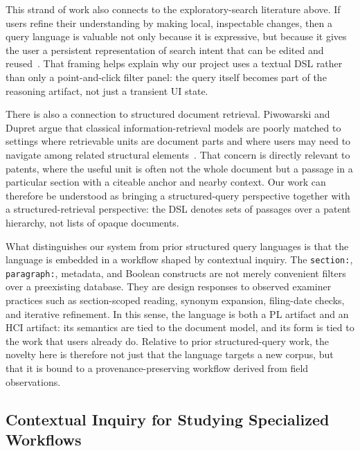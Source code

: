 \documentclass[sigconf]{acmart}
\begin{document}
This strand of work also connects to the exploratory-search literature above.
If users refine their understanding by making local, inspectable changes, then
a query language is valuable not only because it is expressive, but because it
gives the user a persistent representation of search intent that can be edited
and reused~\cite{Marchionini2006,White2009}. That framing helps explain why
our project uses a textual DSL rather than only a point-and-click filter panel:
the query itself becomes part of the reasoning artifact, not just a transient
UI state.

There is also a connection to structured document retrieval. Piwowarski and
Dupret argue that classical information-retrieval models are poorly matched to
settings where retrievable units are document parts and where users may need to
navigate among related structural elements~\cite{Piwowarski2006}. That concern
is directly relevant to patents, where the useful unit is often not the whole
document but a passage in a particular section with a citeable anchor and nearby
context. Our work can therefore be understood as bringing a structured-query
perspective together with a structured-retrieval perspective: the DSL denotes
sets of passages over a patent hierarchy, not lists of opaque documents.

What distinguishes our system from prior structured query languages is that the
language is embedded in a workflow shaped by contextual inquiry. The
\texttt{section:}, \texttt{paragraph:}, metadata, and Boolean constructs are
not merely convenient filters over a preexisting database. They are design
responses to observed examiner practices such as section-scoped reading,
synonym expansion, filing-date checks, and iterative refinement. In this sense,
the language is both a PL artifact and an HCI artifact: its semantics are tied
to the document model, and its form is tied to the work that users already do.
Relative to prior structured-query work, the novelty here is therefore not just
that the language targets a new corpus, but that it is bound to a
provenance-preserving workflow derived from field observations.

\subsection{Contextual Inquiry for Studying Specialized Workflows}
\end{document}

